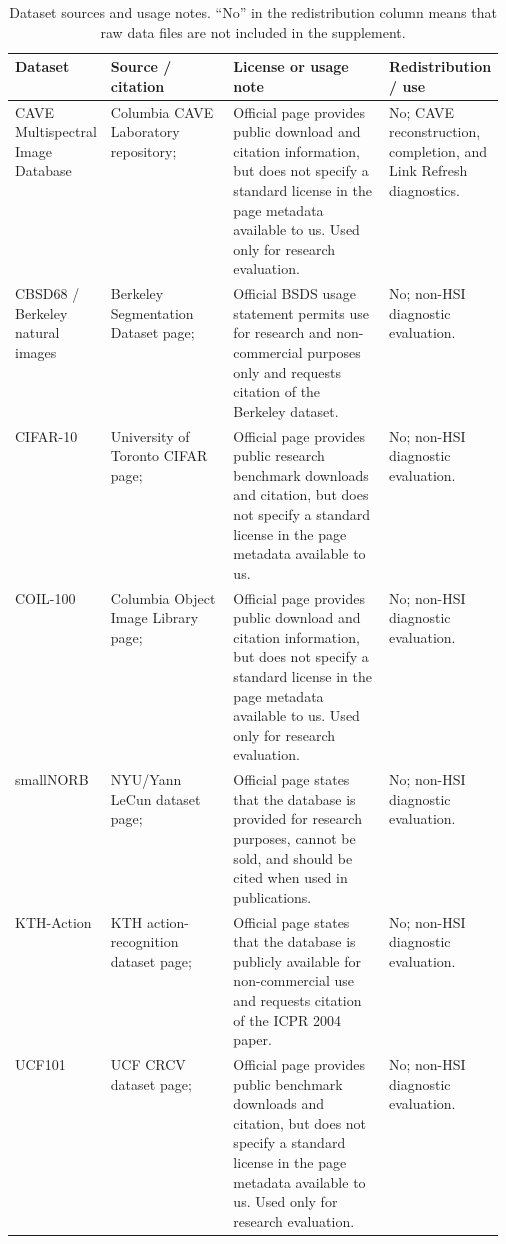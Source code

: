 \begin{table}[ht]
  \centering
  \caption{Dataset sources and usage notes. ``No'' in the redistribution
  column means that raw data files are not included in the supplement.}
  \label{tab:dataset-asset-usage}
  \scriptsize
  \renewcommand{\arraystretch}{1.10}
  \setlength{\tabcolsep}{3pt}
  \begin{tabularx}{\linewidth}{@{}p{0.15\linewidth}p{0.25\linewidth}Xp{0.17\linewidth}@{}}
  \toprule
  Dataset & Source / citation & License or usage note & Redistribution / use \\
  \midrule
  CAVE Multispectral Image Database &
  Columbia CAVE Laboratory repository; \citep{cave_multispectral_database,yasuma2010gapc} &
  Official page provides public download and citation information, but does not
  specify a standard license in the page metadata available to us. Used only for
  research evaluation. &
  No; CAVE reconstruction, completion, and Link Refresh diagnostics. \\
  CBSD68 / Berkeley natural images &
  Berkeley Segmentation Dataset page; \citep{martin2001database} &
  Official BSDS usage statement permits use for research and non-commercial
  purposes only and requests citation of the Berkeley dataset. &
  No; non-HSI diagnostic evaluation. \\
  CIFAR-10 &
  University of Toronto CIFAR page; \citep{krizhevsky2009learning} &
  Official page provides public research benchmark downloads and citation, but
  does not specify a standard license in the page metadata available to us. &
  No; non-HSI diagnostic evaluation. \\
  COIL-100 &
  Columbia Object Image Library page; \citep{nene1996coil100} &
  Official page provides public download and citation information, but does not
  specify a standard license in the page metadata available to us. Used only for
  research evaluation. &
  No; non-HSI diagnostic evaluation. \\
  smallNORB &
  NYU/Yann LeCun dataset page; \citep{LeCun2004SmallNORB} &
  Official page states that the database is provided for research purposes,
  cannot be sold, and should be cited when used in publications. &
  No; non-HSI diagnostic evaluation. \\
  KTH-Action &
  KTH action-recognition dataset page; \citep{Schuldt2004KTHActions} &
  Official page states that the database is publicly available for
  non-commercial use and requests citation of the ICPR 2004 paper. &
  No; non-HSI diagnostic evaluation. \\
  UCF101 &
  UCF CRCV dataset page; \citep{Soomro2012UCF101} &
  Official page provides public benchmark downloads and citation, but does not
  specify a standard license in the page metadata available to us. Used only for
  research evaluation. &
  No; non-HSI diagnostic evaluation. \\
  \bottomrule
  \end{tabularx}
\end{table}
